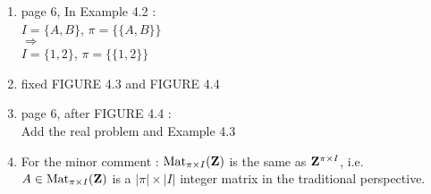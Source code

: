 \documentclass[10pt]{amsart}
\begin{document}
\begin{enumerate}
\item page 6, In Example 4.2 : \\
$I=\{A,B\}$,  $\pi = \{\{A,B\}\}$ \\
$\Longrightarrow$\\
$I=\{1,2\}$,  $\pi = \{\{1,2\}\}$ \\

\item fixed FIGURE 4.3 and FIGURE 4.4 \\

\item page 6, after FIGURE 4.4 :\\
Add the real problem and Example 4.3\\

\item For the minor comment : ${\rm Mat}_{\pi \times I}({\bf Z})$ is the same as ${\bf Z}^{\pi \times I}$,
i.e. $A \in {\rm Mat}_{\pi \times I}({\bf Z})$ is a $|\pi| \times |I|$ integer matrix in the traditional perspective.

\end{enumerate}
\end{document}
